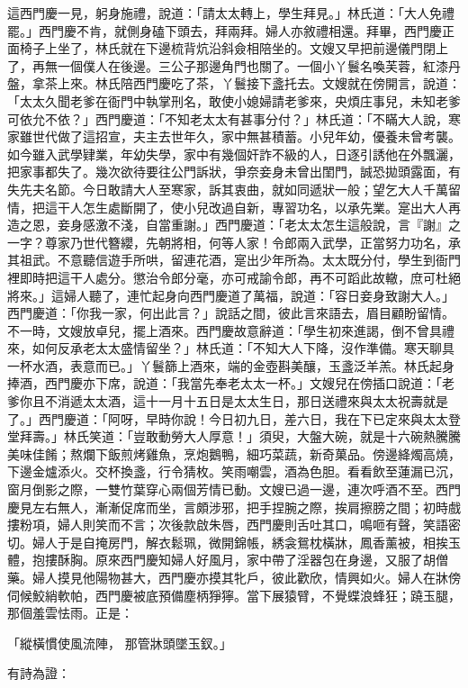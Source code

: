 \begin{showcontents}{}
這西門慶一見，躬身施禮，說道：「請太太轉上，學生拜見。」林氏道：「大人免禮罷。」西門慶不肯，就側身磕下頭去，拜兩拜。婦人亦敘禮相還。拜畢，西門慶正面椅子上坐了，林氏就在下邊梳背炕沿斜僉相陪坐的。文嫂又早把前邊儀門閉上了，再無一個僕人在後邊。三公子那邊角門也關了。一個小丫鬟名喚芙蓉，紅漆丹盤，拿茶上來。林氏陪西門慶吃了茶，丫鬟接下盞托去。文嫂就在傍開言，說道：「太太久聞老爹在衙門中執掌刑名，敢使小媳婦請老爹來，央煩庄事兒，未知老爹可依允不依？」西門慶道：「不知老太太有甚事分付？」林氏道：「不瞞大人說，寒家雖世代做了這招宣，夫主去世年久，家中無甚積蓄。小兒年幼，優養未曾考襲。如今雖入武學肄業，年幼失學，家中有幾個奸詐不級的人，日逐引誘他在外飄灑，把家事都失了。幾次欲待要往公門訴狀，爭奈妾身未曾出閨門，誠恐拋頭露面，有失先夫名節。今日敢請大人至寒家，訴其衷曲，就如同遞狀一般；望乞大人千萬留情，把這干人怎生處斷開了，使小兒改過自新，專習功名，以承先業。寔出大人再造之恩，妾身感激不淺，自當重謝。」西門慶道：「老太太怎生這般說，言『謝』之一字？尊家乃世代簪纓，先朝將相，何等人家！令郎兩入武學，正當努力功名，承其祖武。不意聽信遊手所哄，留連花酒，寔出少年所為。太太既分付，學生到衙門裡即時把這干人處分。懲治令郎分毫，亦可戒諭令郎，再不可蹈此故轍，庶可杜絕將來。」這婦人聽了，連忙起身向西門慶道了萬福，說道：「容日妾身致謝大人。」西門慶道：「你我一家，何出此言？」說話之間，彼此言來語去，眉目顧盼留情。不一時，文嫂放卓兒，擺上酒來。西門慶故意辭道：「學生初來進謁，倒不曾具禮來，如何反承老太太盛情留坐？」林氏道：「不知大人下降，沒作準備。寒天聊具一杯水酒，表意而已。」丫鬟篩上酒來，端的金壺斟美釀，玉盞泛羊羔。林氏起身捧酒，西門慶亦下席，說道：「我當先奉老太太一杯。」文嫂兒在傍插口說道：「老爹你且不消遞太太酒，這十一月十五日是太太生日，那日送禮來與太太祝壽就是了。」西門慶道：「阿呀，早時你說！今日初九日，差六日，我在下已定來與太太登堂拜壽。」林氏笑道：「豈敢動勞大人厚意！」須臾，大盤大碗，就是十六碗熱騰騰美味佳餚；熬爛下飯煎烤雞魚，烹炮鵝鴨，細巧菜蔬，新奇菓品。傍邊絳燭高燒，下邊金爐添火。交杯換盞，行令猜枚。笑雨嘲雲，酒為色胆。看看飲至蓮漏已沉，窗月倒影之際，一雙竹葉穿心兩個芳情已動。文嫂已過一邊，連次呼酒不至。西門慶見左右無人，漸漸促席而坐，言頗涉邪，把手捏腕之際，挨肩擦膀之間；初時戲摟粉項，婦人則笑而不言；次後款啟朱唇，西門慶則舌吐其口，鳴咂有聲，笑語密切。婦人于是自掩房門，解衣鬆珮，微開錦帳，綉衾鴛枕橫牀，鳳香薰被，相挨玉體，抱摟酥胸。原來西門慶知婦人好風月，家中帶了淫器包在身邊，又服了胡僧藥。婦人摸見他陽物甚大，西門慶亦摸其牝戶，彼此歡欣，情興如火。婦人在牀傍伺候鮫綃軟帕，西門慶被底預備塵柄猙獰。當下展猿臂，不覺蝶浪蜂狂；蹺玉腿，那個羞雲怯雨。正是：

「縱橫慣使風流陣，  那管牀頭墜玉釵。」

有詩為證：


\end{showcontents}
